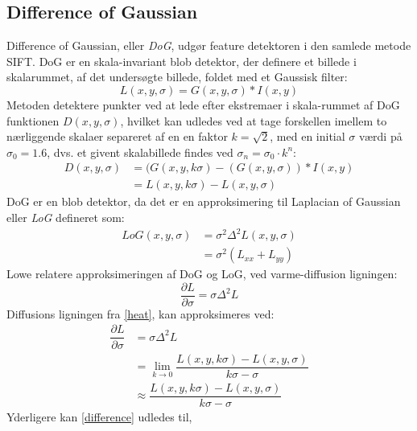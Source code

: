 \subsection{Difference of Gaussian}
Difference of Gaussian, eller \textit{DoG}, udgør feature detektoren i den samlede metode SIFT. DoG er en skala-invariant blob detektor, der definere et billede i skalarummet, af det undersøgte billede, foldet med et Gaussisk filter:
\begin{equation}
L(x,y,\sigma)= G(x,y,\sigma) \ast I(x,y)
\end{equation}
Metoden detektere punkter ved at lede efter ekstremaer i skala-rummet af DoG funktionen $D(x,y,\sigma)$, hvilket kan udledes ved at tage forskellen imellem to nærliggende skalaer separeret af en en faktor $k=\sqrt{2}$, med en initial $\sigma$ værdi på $\sigma_0 = 1.6$, dvs. et givent skalabillede findes ved $\sigma_n=\sigma_0 \cdot k^n$:
\begin{equation}
\begin{split}
D(x,y,\sigma) &= (G(x,y,k\sigma)-(G(x,y,\sigma))\ast I(x,y) \\
           &= L(x,y,k \sigma)-L(x,y,\sigma)
\end{split}
\end{equation}
DoG er en blob detektor, da det er en approksimering til Laplacian of Gaussian eller \textit{LoG} defineret som:
\begin{equation}
\begin{split}
LoG(x,y,\sigma) &= \sigma^2 \Delta^2L(x,y,\sigma) \\
                &= \sigma^2 (L_{xx}+L_{yy})
\end{split}
\end{equation}
Lowe relatere approksimeringen af DoG og LoG, ved varme-diffusion ligningen:
\begin{equation}
\dfrac{\partial L}{\partial \sigma} = \sigma \Delta^2L
\label{heat}
\end{equation}
Diffusions ligningen fra \eqref{heat}, kan approksimeres ved:
\begin{equation}
\begin{split}
\dfrac{\partial L}{\partial \sigma} &= \sigma \Delta^2L \\
&= \lim_{k \to 0} \dfrac{L(x,y,k\sigma)-L(x,y,\sigma)}{k\sigma-\sigma} \\
&\approx \dfrac{L(x,y,k\sigma)-L(x,y,\sigma)}{k\sigma-\sigma}
\end{split}
\label{difference}
\end{equation}
Yderligere kan \eqref{difference} udledes til,
